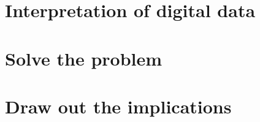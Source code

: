 \documentclass[12pt]{report}
\begin{document}
\section{Interpretation of digital data}




\section{Solve the problem}





\section{Draw out the implications}

\makeworkscited
\end{document}
